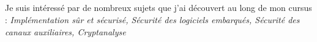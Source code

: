 \documentclass[letterpaper,10pt]{article}
\begin{document}



  \documentTitle{\fullName}
    {\hspace{2pt}\faPhone\ \href{tel:0750641522}{\phonenumber\\}}
    {\faEnvelope\ \href{mailto:florian.duzes@inria.fr}{\mail\\}}
    {\faLinkedin\ \href{https://www.linkedin.com/in/florian-duzes/}{\linkedin\\}}
    {\faGithub\ \href{https://github.com/FloDarPie}{\github}}


\medbreak
{} Je suis intéressé par de nombreux sujets que j'ai découvert au long de mon cursus : \textit{Implémentation sûr et sécurisé, Sécurité des logiciels embarqués, Sécurité des canaux auxiliaires, Cryptanalyse}



  


  


  

\end{document}
